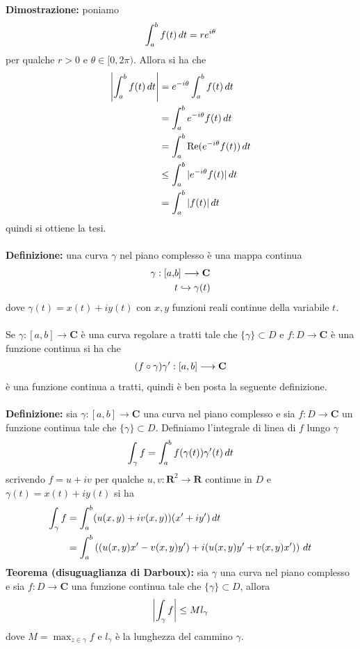\documentclass{article}
\begin{document}
\textbf{Dimostrazione:} poniamo
\begin{gather}
    \int_a^b f(t) \, dt = re^{i\theta} \notag
\end{gather}
per qualche $r > 0$ e $\theta \in [0, 2\pi)$. Allora si ha che
\begin{align}
    \left|\int_a^b f(t) \, dt\right| &= e^{-i\theta}\int_a^b f(t) \, dt \notag \\
    &= \int_a^b e^{-i\theta}f(t) \, dt \notag \\
    &= \int_a^b \mathrm{Re}(e^{-i\theta}f(t)) \, dt \notag \\
    &\leq \int_a^b |e^{-i\theta}f(t)| \, dt \notag \\
    &= \int_a^b |f(t)| \, dt \notag
\end{align}
quindi si ottiene la tesi. \\ \\
\textbf{Definizione:} una curva $\gamma$ nel piano complesso è una mappa continua
\begin{align}
    \gamma : [a,& b] \longrightarrow \mathbf{C} \notag \\
    &t \hookrightarrow \gamma(t) \notag
\end{align}
dove $\gamma(t) = x(t) + iy(t)$ con $x, y$ funzioni reali continue della variabile $t$. \\ \\
Se $\gamma : [a, b] \longrightarrow \mathbf{C}$ è una curva regolare a tratti tale che $\{\gamma\} \subset D$ e $f : D \longrightarrow \mathbf{C}$ è una funzione continua si ha che
\begin{gather}
    (f \circ \gamma)\gamma' : [a, b] \longrightarrow \mathbf{C} \notag
\end{gather}
è una funzione continua a tratti, quindi è ben posta la seguente definizione. \\ \\
\textbf{Definizione:} sia $\gamma : [a, b] \longrightarrow \mathbf{C}$ una curva nel piano complesso e sia $f : D \longrightarrow \mathbf{C}$ un funzione continua tale che $\{\gamma\} \subset D$. Definiamo l'integrale di linea di $f$ lungo $\gamma$
\begin{gather}
    \int_\gamma f = \int_a^b f(\gamma(t))\gamma'(t) \, dt \notag
\end{gather}
scrivendo $f = u + iv$ per qualche $u, v : \mathbf{R}^2 \longrightarrow \mathbf{R}$ continue in $D$ e $\gamma(t) = x(t) + iy(t)$ si ha
\begin{align}
    \int_\gamma f &= \int_a^b (u(x, y) + iv(x, y))(x' + iy') \, dt \notag \\
    &= \int_a^b \left((u(x, y)x' - v(x, y)y') + i(u(x, y)y' + v(x, y)x')\right) \, dt \notag
\end{align}
\textbf{Teorema (disuguaglianza di Darboux):} sia $\gamma$ una curva nel piano complesso e sia $f : D \longrightarrow \mathbf{C}$ una funzione continua tale che $\{\gamma\} \subset D$, allora
\begin{gather}
    \left|\int_\gamma f\right| \leq Ml_\gamma \notag
\end{gather}
dove $M = \max_{z \in \gamma} f$ e $l_\gamma$ è la lunghezza del cammino $\gamma$. \\
\end{document}

